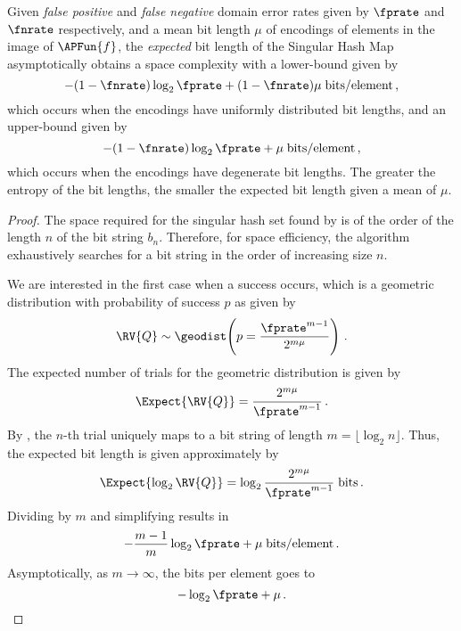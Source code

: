 \documentclass[ ../main.tex]{subfiles}
\begin{document}
\begin{theorem}
Given \emph{false positive} and \emph{false negative} domain error rates given by $\fprate$ and $\fnrate$ respectively, and a mean bit length $\mu$ of encodings of elements in the image of $\APFun{f}$, the \emph{expected} bit length of the Singular Hash Map asymptotically obtains a space complexity with a lower-bound given by
\begin{equation}
    -(1 - \fnrate) \log_2 \fprate + (1 - \fnrate) \mu \; \si{bits \per element}\,,
\end{equation}
which occurs when the encodings have uniformly distributed bit lengths, and an upper-bound given by
\begin{equation}
    -(1 - \fnrate) \log_2 \fprate + \mu \; \si{bits \per element}\,,
\end{equation}
which occurs when the encodings have degenerate bit lengths. The greater the entropy of the bit lengths, the smaller the expected bit length given a mean of $\mu$. 
\end{theorem}
\begin{proof}
The space required for the singular hash set found by  is of the order of the length $n$ of the bit string $b_n$.
Therefore, for space efficiency, the algorithm exhaustively searches for a bit string in the order of increasing size $n$.

We are interested in the first case when a success occurs, which is a geometric distribution with probability of success $p$ as given by
\begin{equation}
    \RV{Q} \sim \geodist\!\left(p = \frac{\fprate^{m-1}}{2^{m \mu}}\right)\,.
\end{equation}
The expected number of trials for the geometric distribution is given by
\begin{equation}
\label{eq:exp_trials}
    \Expect{\RV{Q}} = \frac{2^{m \mu}}{\fprate^{m-1}}\,.
\end{equation}
By , the $n$-th trial uniquely maps to a bit string of length $m = \lfloor \log_2 n \rfloor$.
Thus, the expected bit length is given approximately by
\begin{equation}
    \Expect{\log_2 \RV{Q}} = \log_2 \frac{2^{m \mu}}{\fprate^{m-1}}\; \si{bits}\,.
\end{equation}
Dividing by $m$ and simplifying results in
\begin{equation}
    -\frac{m-1}{m} \log_2 \fprate + \mu\; \si{bits \per element}\,.
\end{equation}
Asymptotically, as $m \to \infty$, the bits per element goes to
\begin{equation}
    -\log_2 \fprate + \mu\,.
\end{equation}
\end{proof}
\end{document}

